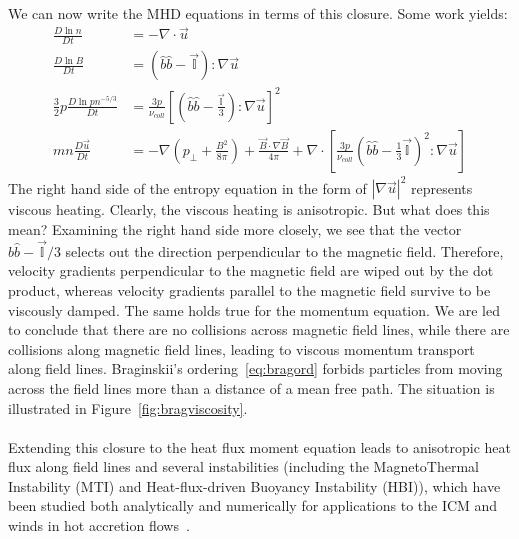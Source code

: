 \\
We can now write the MHD equations in terms of this closure. Some work yields:\\
\begin{align*}
  \frac{D\ln n}{Dt}&=-\nabla\cdot\vec u\\
  \frac{D\ln B}{Dt}&=(\hat b\hat b-\mathbb{\vec I}):\nabla\vec u\\
  \frac32p\frac{D\ln pn^{-5/3}}{Dt}&=\frac{3p}{\nu_{coll}}\left[\left(\hat b\hat b-\frac{\vec{\mathbb{I}}}3\right):\nabla\vec u\right]^2\\
  mn\frac{D\vec u}{Dt}&=-\nabla\left(p_\perp+\frac{B^2}{8\pi}\right)+\frac{\vec B\cdot\nabla\vec B}{4\pi}+\nabla\cdot\left[\frac{3p}{\nu_{coll}}\left(\hat b\hat b-\frac13\vec{\mathbb{I}}\right)^2:\nabla\vec u\right]
\end{align*}
The right hand side of the entropy equation in the form of $|\nabla\vec u|^2$ represents viscous heating. Clearly, the viscous heating is anisotropic. But what does this mean? Examining the right hand side more closely, we see that the vector $\hat b\hat b-\vec{\mathbb{I}}/3$ selects out the direction perpendicular to the magnetic field. Therefore, velocity gradients perpendicular to the magnetic field are wiped out by the dot product, whereas velocity gradients parallel to the magnetic field survive to be viscously damped. The same holds true for the momentum equation. We are led to conclude that there are no collisions across magnetic field lines, while there are collisions along magnetic field lines, leading to viscous momentum transport along field lines. Braginskii's ordering~\ref{eq:bragord} forbids particles from moving across the field lines more than a distance of a mean free path. The situation is illustrated in Figure~\ref{fig:bragviscosity}.\\
\\
Extending this closure to the heat flux moment equation leads to anisotropic heat flux along field lines and several instabilities (including the MagnetoThermal Instability (MTI) and Heat-flux-driven Buoyancy Instability (HBI)), which have been studied both analytically and numerically for applications to the ICM and winds in hot accretion flows~\cite{KunzBraginskii,Balbus2000,Balbus2001,Kunz2011,Parrish2007,Parrish2005,Johnson2007,Bu2016,Quataert2008,Parrish2008a}.
%

